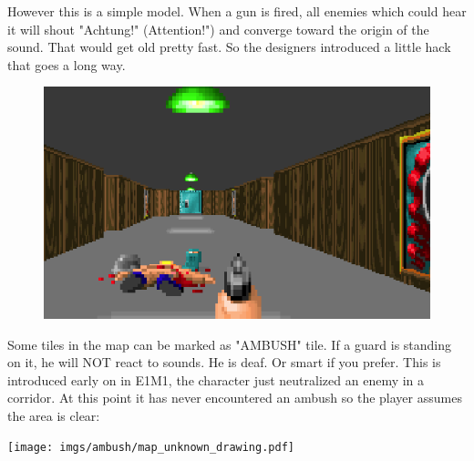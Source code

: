 However this is a simple model. When a gun is fired, all enemies which could hear it will shout "Achtung!" (Attention!") and converge toward the origin of the sound. That would get old pretty fast. So the designers introduced a little hack that goes a long way.

\par
\begin{figure}[H]
 \centering
 \includegraphics[width=\textwidth]{imgs/ambush/map_unknown.png}
\end{figure}
\par

\begin{minipage}{0.6\textwidth}
Some tiles in the map can be marked as "AMBUSH" tile. If a guard is standing on it, he will NOT react to sounds. He is deaf. Or smart if you prefer. This is introduced early on in E1M1, the character just neutralized an enemy in a corridor. At this point it has never encountered an ambush so the player assumes the area is clear:\\
\end{minipage}
\begin{minipage}{0.4\textwidth}
\begin{flushright}
\texttt{[image: imgs/ambush/map\_unknown\_drawing.pdf]}
\end{flushright}  
\end{minipage}
\noindent
\\


